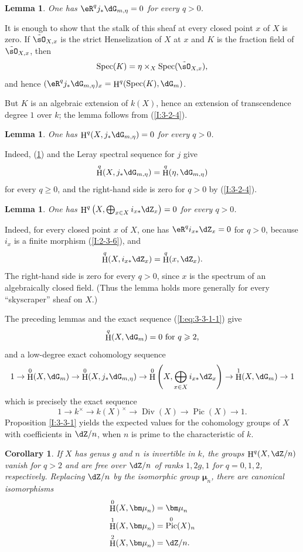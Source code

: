\documentclass[12pt,oneside,english]{smfbook}
\DeclareMathOperator{\Div}{Div}
\DeclareMathOperator{\h}{H}
\DeclareMathOperator{\pic}{Pic}
\DeclareMathOperator{\spec}{Spec}
\newcommand{\dmu}{{\bm\mu}}
\newcounter{char}
\newtheorem{corollary}[subsubsection]{Corollary}
\newtheorem{lemma}[subsubsection]{Lemma}
\begin{document}
\begin{lemma}\label{I:3-3-2}
One has $\eR^qj_*\dG_{m,\eta}=0$ for every $q>0$.
\end{lemma}

It is enough to show that the stalk of this sheaf at every closed point $x$ of $X$ is zero. If $\tilde\sO_{X,x}$ is the strict Henselization of $X$ at $x$ and $K$ is the fraction field of $\tilde\sO_{X,x}$, then
\[
  \spec(K) = \eta\times_X \spec(\tilde\sO_{X,x})\text{,}
\]
and hence $(\eR^qj_*\dG_{m,\eta})_x=\h^q(\spec(K),\dG_m)$.

But $K$ is an algebraic extension of $k(X)$, hence an extension of transcendence degree $1$ over $k$; the lemma follows from (\ref{I:3-2-4}).

\begin{lemma}\label{I:3-3-3}
One has $\h^q(X,j_*\dG_{m,\eta})=0$ for every $q>0$.
\end{lemma}

Indeed, (\ref{I:3-3-2}) and the Leray spectral sequence for $j$ give
\[
  \h^q(X, j_* \dG_{m,\eta}) = \h^q(\eta,\dG_{m,\eta})
\]
for every $q\geqslant0$, and the right-hand side is zero for $q>0$ by (\ref{I:3-2-4}).

\begin{lemma}\label{I:3-3-4}
One has $\h^q\left(X,\bigoplus_{x\in X}i_{x*}\dZ_x\right)=0$ for every $q>0$.
\end{lemma}

Indeed, for every closed point $x$ of $X$, one has $\eR^qi_{x*}\dZ_x=0$ for $q>0$, because $i_x$ is a finite morphism (\ref{I:2-3-6}), and
\[
  \h^q(X,i_{x*}\dZ_x) = \h^q(x,\dZ_x)\text{.}
\]
The right-hand side is zero for every $q>0$, since $x$ is the spectrum of an algebraically closed field. (Thus the lemma holds more generally for every ``skyscraper'' sheaf on $X$.)

The preceding lemmas and the exact sequence (\ref{I:eq:3-3-1-1}) give
\[
  \h^q(X,\dG_m) = 0 \text{ for $q\geqslant 2$,}
\]
and a low-degree exact cohomology sequence
\[
  1 \to \h^0(X,\dG_m) \to \h^0(X, j_*\dG_{m,\eta}) \to \h^0\left(X,\bigoplus_{x\in X} i_{x*}\dZ_x\right) \to \h^1(X,\dG_m) \to 1
\]
which is precisely the exact sequence
\[
  1 \to k^\times \to k(X)^\times\to \Div(X) \to \pic(X) \to 1\text{.}
\]
Proposition \ref{I:3-3-1} yields the expected values for the cohomology groups of $X$ with coefficients in $\dZ/n$, when $n$ is prime to the characteristic of $k$.

\begin{corollary}\label{I:3-3-5}
If $X$ has genus $g$ and $n$ is invertible in $k$, the groups $\h^q(X,\dZ/n)$ vanish for $q>2$ and are free over $\dZ/n$ of ranks $1,2g,1$ for $q=0,1,2$, respectively. Replacing $\dZ/n$ by the isomorphic group $\dmu_n$, there are canonical isomorphisms
\begin{align*}
  \h^0(X,\dmu_n) &= \dmu_n \\
  \h^1(X,\dmu_n) &= \pic^0(X)_n \\
  \h^2(X,\dmu_n) &= \dZ/n \text{.}
\end{align*}
\end{corollary}
\end{document}
